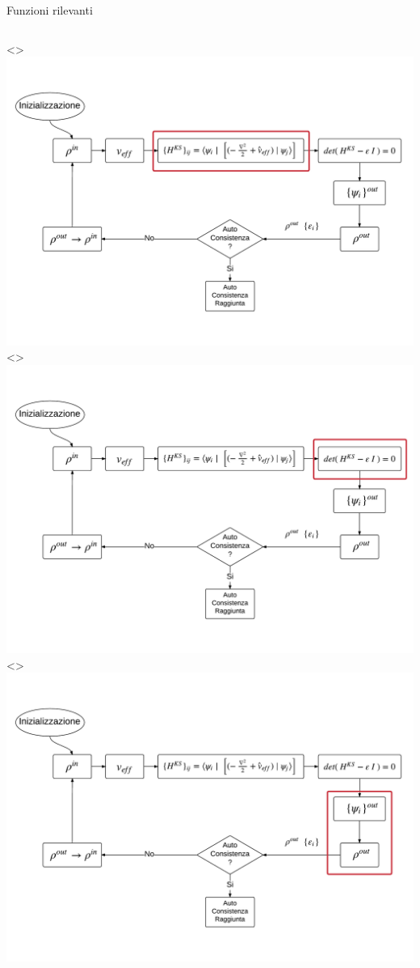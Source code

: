 \documentclass[8pt]{beamer}
\begin{document}
\begin{frame}{Funzioni rilevanti}
{\begin{minipage}[t][0.5\textheight][t]{\textwidth}
\begin{columns}
\begin{flushleft}
{				}
				\only<\hpsiPos>{
					\includegraphics[height=\scfPicHeight\textheight, width=\scfPicWidth\textwidth]{beam_SCF_h_psi.pdf}	
				}
				\only<\cdiaghgPos>{
					\includegraphics[height=\scfPicHeight\textheight, width=\scfPicWidth\textwidth]{beam_SCF_cdiaghg.pdf}	
				}
				\only<\sumbandPos>{
					\includegraphics[height=\scfPicHeight\textheight, width=\scfPicWidth\textwidth]{beam_SCF_sum_bands.pdf}	
				}


\end{flushleft}
\end{columns}
\end{minipage}}
\end{frame}
\end{document}
